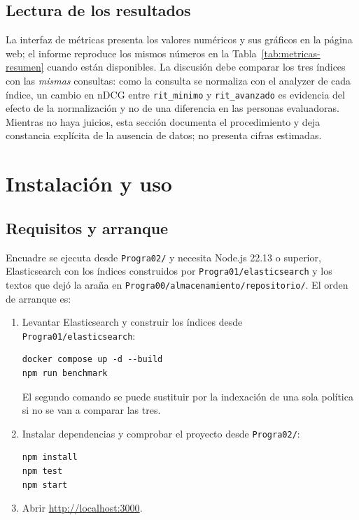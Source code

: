 \documentclass[11pt,spanish]{article}
\begin{document}
\subsection{Lectura de los resultados}

La interfaz de métricas presenta los valores numéricos y sus gráficos en la
página web; el informe reproduce los mismos números en la
Tabla~\ref{tab:metricas-resumen} cuando están disponibles. La discusión debe
comparar los tres índices con las \emph{mismas} consultas: como la consulta se
normaliza con el analyzer de cada índice, un cambio en nDCG entre
\texttt{rit\_minimo} y \texttt{rit\_avanzado} es evidencia del efecto de la
normalización y no de una diferencia en las personas evaluadoras. Mientras no
haya juicios, esta sección documenta el procedimiento y deja constancia
explícita de la ausencia de datos; no presenta cifras estimadas.

\section{Instalación y uso}
\label{sec:uso}

\subsection{Requisitos y arranque}
\label{sec:arranque}

Encuadre se ejecuta desde \texttt{Progra02/} y necesita Node.js 22.13 o
superior, Elasticsearch con los índices construidos por
\texttt{Progra01/elasticsearch} y los textos que dejó la araña en
\texttt{Progra00/almacenamiento/repositorio/}. El orden de arranque es:

\begin{enumerate}[label=\arabic*.]
  \item Levantar Elasticsearch y construir los índices desde
    \texttt{Progra01/elasticsearch}:
    \begin{lstlisting}
docker compose up -d --build
npm run benchmark
    \end{lstlisting}
    El segundo comando se puede sustituir por la indexación de una sola
    política si no se van a comparar las tres.
  \item Instalar dependencias y comprobar el proyecto desde \texttt{Progra02/}:
    \begin{lstlisting}
npm install
npm test
npm start
    \end{lstlisting}
  \item Abrir \url{http://localhost:3000}.
\end{enumerate}
\end{document}
